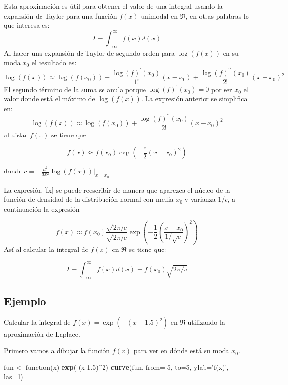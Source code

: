 \documentclass[10pt,]{krantz}
\makeatletter
\newenvironment{Shaded}{\begin{snugshade}}{\end{snugshade}}
\newcommand{\KeywordTok}[1]{\textcolor[rgb]{0.13,0.29,0.53}{\textbf{{#1}}}}
\newcommand{\DataTypeTok}[1]{\textcolor[rgb]{0.13,0.29,0.53}{{#1}}}
\newcommand{\DecValTok}[1]{\textcolor[rgb]{0.00,0.00,0.81}{{#1}}}
\newcommand{\FloatTok}[1]{\textcolor[rgb]{0.00,0.00,0.81}{{#1}}}
\newcommand{\StringTok}[1]{\textcolor[rgb]{0.31,0.60,0.02}{{#1}}}
\newcommand{\NormalTok}[1]{{#1}}
\newenvironment{kframe}{%
\medskip{}
\setlength{\fboxsep}{.8em}
 \def\at@end@of@kframe{}%
 \ifinner\ifhmode%
  \def\at@end@of@kframe{\end{minipage}}%
  \begin{minipage}{\columnwidth}%
 \fi\fi%
 \def\FrameCommand##1{\hskip\@totalleftmargin \hskip-\fboxsep
 \colorbox{shadecolor}{##1}\hskip-\fboxsep
     \hskip-\linewidth \hskip-\@totalleftmargin \hskip\columnwidth}%
 \MakeFramed {\advance\hsize-\width
   \@totalleftmargin\z@ \linewidth\hsize
   \@setminipage}}%
 {\par\unskip\endMakeFramed%
 \at@end@of@kframe}
\renewenvironment{Shaded}{\begin{kframe}}{\end{kframe}}
\makeatother
\begin{document}
Esta aproximación es útil para obtener el valor de una integral usando
la expansión de Taylor para una función \(f(x)\) unimodal en \(\Re\), en
otras palabras lo que interesa es:
\[ I = \int_{-\infty}^{\infty} f(x) d(x)\] Al hacer una expansión de
Taylor de segundo orden para \(\log(f(x))\) en su moda \(x_0\) el
resultado es:
\[ \log(f(x)) \approx \log(f(x_0)) + \frac{\log(f)^\prime(x_0)}{1!} (x-x_0) + \frac{\log(f)^{\prime \prime}(x_0)}{2!} (x-x_0)^2 \]
El segundo término de la suma se anula porque \(\log(f)^\prime(x_0)=0\)
por ser \(x_0\) el valor donde está el máximo de \(\log(f(x))\). La
expresión anterior se simplifica en:
\[ \log(f(x)) \approx \log(f(x_0)) + \frac{\log(f)^{\prime \prime}(x_0)}{2!} (x-x_0)^2 \]
al aislar \(f(x)\) se tiene que

\begin{equation} \label{fx}
f(x) \approx f(x_0)  \exp \left( -\frac{c}{2} (x-x_0)^2 \right)
\end{equation}

donde \(c=-\frac{d^2}{dx^2} \log(f(x)) \bigg|_{x=x_0}\).

La expresión \ref{fx} se puede reescribir de manera que aparezca el
núcleo de la función de densidad de la distribución normal con media
\(x_0\) y varianza \(1/c\), a continuación la expresión

\[
f(x) \approx f(x_0) \frac{\sqrt{2 \pi / c}}{\sqrt{2 \pi / c}}  \exp \left( -\frac{1}{2} \left( \frac{x-x_0}{1/\sqrt{c}} \right)^2 \right)
\] Así al calcular la integral de \(f(x)\) en \(\Re\) se tiene que:

\begin{equation} \label{aprox_laplace}
I = \int_{-\infty}^{\infty} f(x) d(x) = f(x_0) \sqrt{2 \pi / c}
\end{equation}

\subsection*{Ejemplo}\label{ejemplo-44}


Calcular la integral de \(f(x)=\exp \left( -(x-1.5)^2 \right)\) en
\(\Re\) utilizando la aproximación de Laplace.

Primero vamos a dibujar la función \(f(x)\) para ver en dónde está su
moda \(x_0\).

\begin{Shaded}
\begin{Highlighting}[]
\NormalTok{fun <-}\StringTok{ }\NormalTok{function(x) }\KeywordTok{exp}\NormalTok{(-(x}\FloatTok{-1.5}\NormalTok{)^}\DecValTok{2}\NormalTok{)}
\KeywordTok{curve}\NormalTok{(fun, }\DataTypeTok{from=}\NormalTok{-}\DecValTok{5}\NormalTok{, }\DataTypeTok{to=}\DecValTok{5}\NormalTok{, }\DataTypeTok{ylab=}\StringTok{'f(x)'}\NormalTok{, }\DataTypeTok{las=}\DecValTok{1}\NormalTok{)}
\end{Highlighting}
\end{Shaded}
\end{document}
